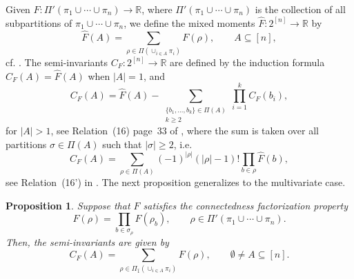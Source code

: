 \documentclass[12pt]{article}
\newcommand{\R}{\mathbb{R}}
\newtheorem{prop}{Proposition}[section]
\newtheorem{definition}[prop]{Definition}
\numberwithin{equation}{section}
\begin{document}
 Given $F:\Pi'(\pi_1\cup \cdots \cup \pi_n )\to\R$, %
 where $\Pi'(\pi_1\cup \cdots \cup \pi_n )$ is the collection of all subpartitions of $\pi_1\cup \cdots \cup \pi_n $, 
 we define the mixed moments $\widehat{F}:2^{[n]}\to\R$ by 
\begin{equation}
\label{mm} 
  \widehat{F}(A)=\sum_{\rho\in\Pi(\cup_{i\in A}\pi_i)}F(\rho),
  \qquad
   A\subseteq[n], 
\end{equation}
cf. \cite[p.~33]{MalyshevMinlos91}.
The semi-invariants $C_F:2^{[n]}\to\R$ are defined by the induction formula
 $C_F(A)=\widehat{F}(A)$ when $|A|=1$, and 
\begin{equation}
\nonumber
C_F(A)=\widehat{F}(A)-\sum_{\substack{\{b_1,\dots,b_k\}\in\Pi(A)\\k\ge2}}\prod_{i=1}^kC_F(b_i),
\end{equation}
for $|A|>1$,
see Relation~(16) page~33 of \cite{MalyshevMinlos91}, 
where the sum is taken over all partitions $\sigma\in\Pi(A)$
such that $|\sigma|\ge2$,
i.e.
\begin{equation}
\label{2} 
C_F(A)=\sum_{\rho\in\Pi(A)}
  (-1)^{|\rho|} (|\rho|-1)!
 \prod_{b\in\rho} \widehat{F}( b),
\end{equation}
 see Relation~(16') in \cite{MalyshevMinlos91}.
 The next proposition generalizes \cite[Proposition~3.3]{LiuPrivault} to
the multivariate case.
\begin{prop}
 Suppose that $F$ satisfies the connectedness factorization property 
\begin{equation}\label{factor-1}
  F(\rho)=\prod_{b\in\sigma_\rho}F(\rho_b),
  \qquad
   \rho\in\Pi'(\pi_1\cup \cdots \cup \pi_n ). 
\end{equation}
 Then, the semi-invariants are given by
 \begin{equation}
   \label{eq-1} 
  C_F(A)=\sum_{\rho\in\Pi_{\widehat{1}}(\cup_{i\in A}\pi_i)}F(\rho),
  \qquad
  \emptyset \not= A\subseteq [n].
\end{equation}
\end{prop}
\end{document}
